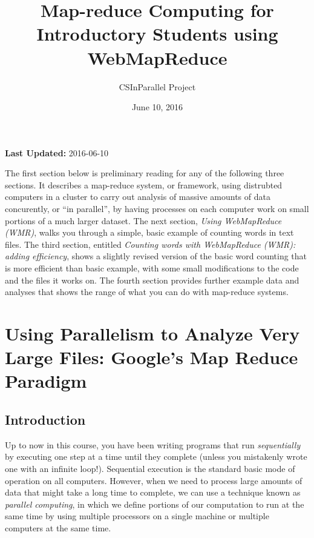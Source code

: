 \documentclass[letterpaper,10pt,openany,oneside]{sphinxmanual}
\title{Map-reduce Computing for Introductory Students using WebMapReduce}
\date{June 10, 2016}
\author{CSInParallel Project}
\begin{document}
\maketitle
\tableofcontents
{}\label{index::doc}


\textbf{Last Updated:} 2016-06-10

The first section below is preliminary reading for any of the following three sections.
It describes a map-reduce system, or framework, using distrubted computers in a cluster
to carry out analysis of massive amounts of data concurently, or ``in parallel'', by having
processes on each computer work on small portions of a much larger dataset.
The next section, \emph{Using WebMapReduce (WMR)}, walks you through a simple, basic example of
counting words in text files.  The third section, entitled
\emph{Counting words with WebMapReduce (WMR): adding efficiency}, shows a slightly revised version
of the basic word counting that is more efficient than basic example, with some small modifications
to the code and the files it works on.  The fourth section provides further example
data and analyses that shows the range of what you can do with map-reduce systems.


\chapter{Using Parallelism to Analyze Very Large Files: Google's Map Reduce Paradigm}
\label{MapReduceIntro/MapReduceIntro:map-reduce-computing-for-introductory-students-using-webmapreduce}\label{MapReduceIntro/MapReduceIntro::doc}\label{MapReduceIntro/MapReduceIntro:using-parallelism-to-analyze-very-large-files-google-s-map-reduce-paradigm}

\section{Introduction}
\label{MapReduceIntro/MapReduceIntro:introduction}
Up to now in this course, you have been writing programs that run
\emph{sequentially} by executing one step at a time until they complete
(unless you mistakenly wrote one with an infinite loop!).
Sequential execution is the standard basic mode of operation on all
computers. However, when we need to process large amounts of data
that might take a long time to complete, we can use a technique
known as \emph{parallel computing}, in which we define portions of our
computation to run at the same time by using multiple processors on
a single machine or multiple computers at the same time.
\end{document}
